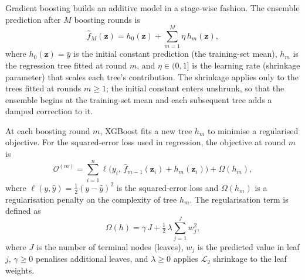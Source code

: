 Gradient boosting builds an additive model in a stage-wise fashion.  The
ensemble prediction after $M$ boosting rounds is
\begin{equation}
    \hat{f}_{M}(\mathbf{z})
    =
    h_0(\mathbf{z})
    +
    \sum_{m=1}^{M}
    \eta \, h_m(\mathbf{z}),
    \label{eq:xgb_additive_model}
\end{equation}
where $h_0(\mathbf{z}) = \bar{y}$ is the initial constant prediction
(the training-set mean), $h_m$ is the regression tree fitted at round $m$,
and $\eta \in (0,1]$ is the learning rate (shrinkage parameter) that
scales each tree's contribution.  The shrinkage applies only to the
trees fitted at rounds $m \ge 1$; the initial constant enters
unshrunk, so that the ensemble begins at the training-set mean and each
subsequent tree adds a damped correction to it.

At each boosting round $m$, XGBoost fits a new tree $h_m$ to
minimise a regularised objective.  For the squared-error loss used in
regression, the objective at round $m$ is
\begin{equation}
    \mathcal{O}^{(m)}
    =
    \sum_{i=1}^{n}
    \ell\!\bigl(y_i,\, \hat{f}_{m-1}(\mathbf{z}_i) + h_m(\mathbf{z}_i)\bigr)
    +
    \Omega(h_m),
    \label{eq:xgb_objective}
\end{equation}
where $\ell(y, \hat{y}) = \tfrac{1}{2}(y - \hat{y})^{2}$ is the
squared-error loss and $\Omega(h_m)$ is a regularisation penalty on the
complexity of tree $h_m$.  The regularisation term is defined as
\begin{equation}
    \Omega(h)
    =
    \gamma \, J
    +
    \tfrac{1}{2}\,\lambda
    \sum_{j=1}^{J}
    w_j^{2},
    \label{eq:xgb_regularisation}
\end{equation}
where $J$ is the number of terminal nodes (leaves), $w_j$ is the
predicted value in leaf $j$, $\gamma \ge 0$ penalises additional leaves,
and $\lambda \ge 0$ applies $\mathcal{L}_2$ shrinkage to the leaf weights.

